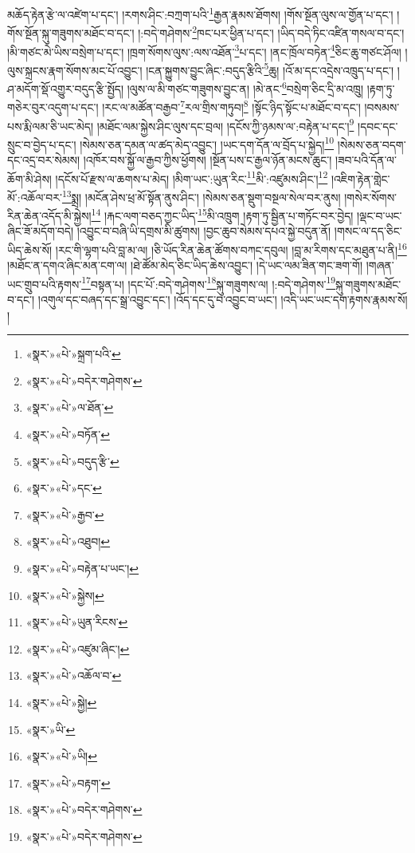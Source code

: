 མཆོད་རྟེན་རྩེ་ལ་འཛེག་པ་དང་། །རགས་ཤིང་:བཀྲག་པའི་\footnote{«སྣར་»«པེ་»སྐྲག་པའི་}རྒྱན་རྣམས་ཐོགས། །གོས་སྔོན་ལུས་ལ་གྱོན་པ་དང་། །གོས་སྔོན་སྐུ་གཟུགས་མཐོང་བ་དང་། །:བདེ་གཤེགས་\footnote{«སྣར་»«པེ་»བདེར་གཤེགས་}ཁང་པར་ཕྱིན་པ་དང་། །ཡིད་བདེ་ཏིང་འཛིན་གསལ་བ་དང་། །མི་གཙང་མེ་ཡིས་བསྲེག་པ་དང་། །ཁྲག་སོགས་ལུས་:ལས་འཐོན་\footnote{«སྣར་»«པེ་»ལ་ཐོན་}པ་དང་། །ནང་ཁྲོལ་བཏེན་\footnote{«སྣར་»«པེ་»བཏོན་}ཅིང་ཆུ་གཙང་ཤོལ། །ལུས་སྐྲངས་རྣག་སོགས་མང་པོ་འབྱུང་། །ངན་སྐྱུགས་བྱུང་ཞིང་:བདུད་རྩིའི་\footnote{«སྣར་»«པེ་»བདུད་རྩི་}ཆུ། །འོ་མ་དང་འདྲེས་འཁྲུད་པ་དང་། །ཤ་མདོག་སྡོ་འགྱུར་བདུད་རྩི་སྤྱོད། །ལུས་ལ་མི་གཙང་གཟུགས་བྱུང་ན། །མེ་ནང་\footnote{«སྣར་»«པེ་»དང་}བསྲེག་ཅིང་དྲི་མ་འཁྲུ། །རྟག་ཏུ་གཅེར་བུར་འདུག་པ་དང་། །རང་ལ་མཚོན་བརྒྱབ་\footnote{«སྣར་»«པེ་»རྒྱབ་}རལ་གྲིས་གཏུབ།\footnote{«སྣར་»«པེ་»འཐུབ།} །སྟོང་ཉིད་སྟོང་པ་མཐོང་བ་དང་། །བསམས་པས་རྨི་ལམ་ཅི་ཡང་མེད། །མཐོང་ལམ་སྐྱེས་ཤིང་ལུས་དང་བྲལ། །དངོས་ཀྱི་ཉམས་ལ་:བརྟེན་པ་དང་།\footnote{«སྣར་»«པེ་»བརྟེན་པ་ཡང་།} །དབང་དང་སྲུང་བ་བྱེད་པ་དང་། །སེམས་ཅན་དམན་ལ་ཚད་མེད་འབྱུང་། །ཡང་དག་དོན་ལ་བྲོད་པ་སྐྱེད།\footnote{«སྣར་»«པེ་»སྐྱེས།} །སེམས་ཅན་བདག་དང་འདྲ་བར་སེམས། །འཁོར་བས་སྐྱོ་ལ་རྒྱབ་ཀྱིས་ཕྱོགས། །སྔོན་པས་ང་རྒྱལ་ཉོན་མངས་ཆུང་། །ཟབ་པའི་དོན་ལ་ཆོག་མི་ཤེས། །དངོས་པོ་རྫས་ལ་ཆགས་པ་མེད། །མིག་ཡང་:ཡུན་རིང་\footnote{«སྣར་»«པེ་»ཡུན་རིངས་}མི་:འཛུམས་ཤིང་།\footnote{«སྣར་»«པེ་»འཛུམ་ཞིང་།} །འཇིག་རྟེན་གླེང་མོ་:འཆོལ་བར་\footnote{«སྣར་»«པེ་»འཆོལ་བ་}སྨྲ། །མངོན་ཤེས་ཕྲ་མོ་སྟོན་ནུས་ཤིང་། །སེམས་ཅན་སྡུག་བསྔལ་སེལ་བར་ནུས། །གསེར་སོགས་རིན་ཆེན་འདོད་མི་སྐྱེས།\footnote{«སྣར་»«པེ་»སྐྱེ།} །རྐང་ལག་བཅད་ཀྱང་ཡིད་\footnote{«སྣར་»ཡི་}མི་འཁྲུག །རྟག་ཏུ་སྦྱིན་པ་གཏོང་བར་བྱེད། །ལྡང་བ་ཡང་ཞིང་ཟོ་མདོག་བདེ། །འབྱུང་བ་བཞི་ཡི་དགྲས་མི་ཚུགས། །བྱང་ཆུབ་སེམས་དཔའ་སྐྱེ་བདུན་ནོ། །གསང་ལ་དད་ཅིང་ཡིད་ཆེས་སོ། །རང་གི་ལྷག་པའི་བླ་མ་ལ། །ཅི་ཡོད་རིན་ཆེན་ཚོགས་བཀང་དབུལ། །བླ་མ་རིགས་དང་མཐུན་པ་ནི།\footnote{«སྣར་»«པེ་»ཡི།} །མཐོང་ན་དགའ་ཞིང་མན་ངག་ལ། །ཐེ་ཚོམ་མེད་ཅིང་ཡིད་ཆེས་འབྱུང་། །དེ་ཡང་ལམ་ཟིན་གང་ཟག་གོ། །གཞན་ཡང་གྲུབ་པའི་རྟགས་\footnote{«སྣར་»«པེ་»བརྟག་}བསྟན་པ། །དང་པོ་:བདེ་གཤེགས་\footnote{«སྣར་»«པེ་»བདེར་གཤེགས་}སྐུ་གཟུགས་ལ། །:བདེ་གཤེགས་\footnote{«སྣར་»«པེ་»བདེར་གཤེགས་}སྐུ་གཟུགས་མཐོང་བ་དང་། །འགུལ་དང་བཞད་དང་སྒྲ་འབྱུང་དང་། །འོད་དང་དུ་བ་འབྱུང་བ་ཡང་། །འདི་ཡང་ཡང་དག་རྟགས་རྣམས་སོ། །
